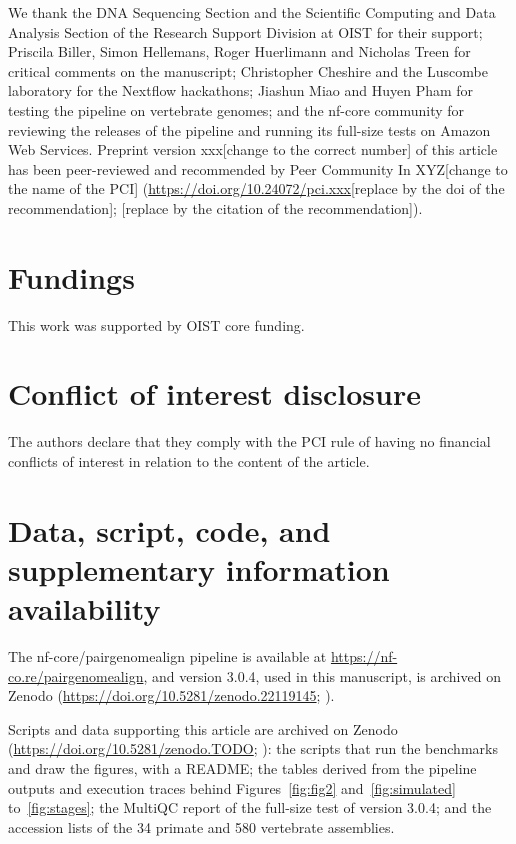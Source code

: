 \documentclass[PCJ,Unicode,screen]{cedram}
\begin{document}
We thank the DNA Sequencing Section and the Scientific Computing and Data Analysis Section of the Research Support Division at OIST for their support; Priscila Biller, Simon Hellemans, Roger Huerlimann and Nicholas Treen for critical comments on the manuscript; Christopher Cheshire and the Luscombe laboratory for the Nextflow hackathons; Jiashun Miao and Huyen Pham for testing the pipeline on vertebrate genomes; and the nf-core community for reviewing the releases of the pipeline and running its full-size tests on Amazon Web Services.  Preprint version xxx[change to the correct number] of this article has been peer-reviewed and recommended by Peer Community In XYZ[change to the name of the PCI] (\url{https://doi.org/10.24072/pci.xxx}[replace by the doi of the recommendation]; \cite{fake}[replace by the citation of the recommendation]).

\section*{Fundings}

This work was supported by OIST core funding.

\section*{Conflict of interest disclosure}

The authors declare that they comply with the PCI rule of having no financial conflicts of interest in relation to the content of the article.

\section*{Data, script, code, and supplementary information availability}

The nf-core/pairgenomealign pipeline is available at \url{https://nf-co.re/pairgenomealign}, and version 3.0.4, used in this manuscript, is archived on Zenodo (\url{https://doi.org/10.5281/zenodo.22119145}; \cite{pairgenomealign}).

Scripts and data supporting this article are archived on Zenodo (\url{https://doi.org/10.5281/zenodo.TODO}; \cite{pairgenomealign_paper_data}): the scripts that run the benchmarks and draw the figures, with a README; the tables derived from the pipeline outputs and execution traces behind Figures~\ref{fig:fig2} and~\ref{fig:simulated} to~\ref{fig:stages}; the MultiQC report of the full-size test of version 3.0.4; and the accession lists of the 34 primate and 580 vertebrate assemblies.
\end{document}
